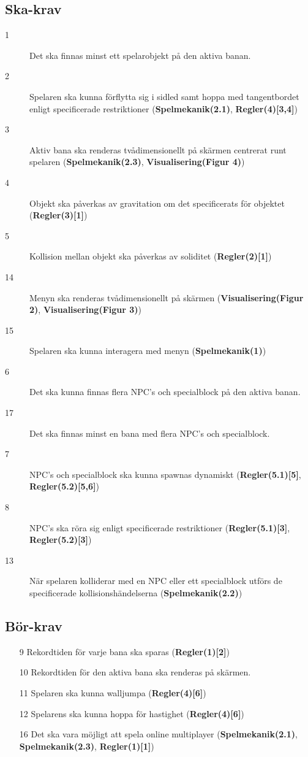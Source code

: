 \documentclass{TDP003mall}
\begin{document}
\subsection{Ska-krav}
\begin{description}
\item[1] Det ska finnas minst ett spelarobjekt på den aktiva banan.
\item[2] Spelaren ska kunna förflytta sig i sidled samt hoppa med tangentbordet enligt specificerade restriktioner (\textbf{Spelmekanik(2.1)}, \textbf{Regler(4)[3,4]})
\item[3] Aktiv bana ska renderas tvådimensionellt på skärmen centrerat runt spelaren (\textbf{Spelmekanik(2.3)}, \textbf{Visualisering(Figur 4)})
\item[4] Objekt ska påverkas av gravitation om det specificerats för objektet (\textbf{Regler(3)[1]})
\item[5] Kollision mellan objekt ska påverkas av soliditet (\textbf{Regler(2)[1]})
\item[14] Menyn ska renderas tvådimensionellt på skärmen (\textbf{Visualisering(Figur 2)}, \textbf{Visualisering(Figur 3)})
\item[15] Spelaren ska kunna interagera med menyn (\textbf{Spelmekanik(1)})
\item[6] Det ska kunna finnas flera NPC's och specialblock på den aktiva banan.
\item[17] Det ska finnas minst en bana med flera NPC's och specialblock.
\item[7] NPC's och specialblock ska kunna spawnas dynamiskt (\textbf{Regler(5.1)[5]}, \textbf{Regler(5.2)[5,6]})
\item[8] NPC's ska röra sig enligt specificerade restriktioner (\textbf{Regler(5.1)[3]}, \textbf{Regler(5.2)[3]})
\item[13] När spelaren kolliderar med en NPC eller ett specialblock utförs de specificerade kollisionshändelserna (\textbf{Spelmekanik(2.2)})
\end{description}

\subsection{Bör-krav}
\begin{itemize}
\item[9] Rekordtiden för varje bana ska sparas (\textbf{Regler(1)[2]})
\item[10] Rekordtiden för den aktiva bana ska renderas på skärmen.
\item[11] Spelaren ska kunna walljumpa (\textbf{Regler(4)[6]})
\item[12] Spelarens ska kunna hoppa för hastighet (\textbf{Regler(4)[6]})
\item[16] Det ska vara möjligt att spela online multiplayer (\textbf{Spelmekanik(2.1)}, \textbf{Spelmekanik(2.3)}, \textbf{Regler(1)[1]})
\end{itemize}
\end{document}
